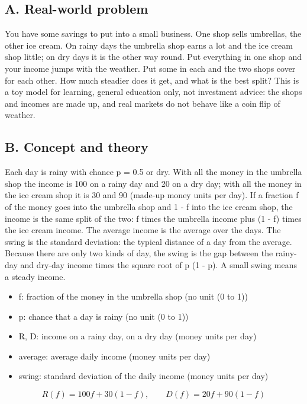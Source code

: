 \documentclass[11pt,a4paper]{article}
\begin{document}
\subsection*{A. Real-world problem}
You have some savings to put into a small business. One shop sells umbrellas, the other ice cream. On rainy days the umbrella shop earns a lot and the ice cream shop little; on dry days it is the other way round. Put everything in one shop and your income jumps with the weather. Put some in each and the two shops cover for each other. How much steadier does it get, and what is the best split? This is a toy model for learning, general education only, not investment advice: the shops and incomes are made up, and real markets do not behave like a coin flip of weather.

\subsection*{B. Concept and theory}
Each day is rainy with chance p = 0.5 or dry. With all the money in the umbrella shop the income is 100 on a rainy day and 20 on a dry day; with all the money in the ice cream shop it is 30 and 90 (made-up money units per day). If a fraction f of the money goes into the umbrella shop and 1 - f into the ice cream shop, the income is the same split of the two: f times the umbrella income plus (1 - f) times the ice cream income. The average income is the average over the days. The swing is the standard deviation: the typical distance of a day from the average. Because there are only two kinds of day, the swing is the gap between the rainy-day and dry-day income times the square root of p (1 - p). A small swing means a steady income.

\begin{itemize}[nosep]
\item f: fraction of the money in the umbrella shop (no unit (0 to 1))
\item p: chance that a day is rainy (no unit (0 to 1))
\item R, D: income on a rainy day, on a dry day (money units per day)
\item average: average daily income (money units per day)
\item swing: standard deviation of the daily income (money units per day)
\end{itemize}

\begin{equation*}
R(f)=100f+30(1-f),\qquad D(f)=20f+90(1-f)
\end{equation*}
\end{document}
